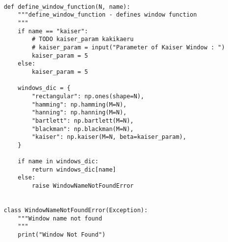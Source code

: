 \begin{lstlisting}[caption=plot\_tools.py,label=plot\_tools.py]
    
    def define_window_function(N, name):
        """define_window_function - defines window function
        """
        if name == "kaiser":
            # TODO kaiser_param kakikaeru
            # kaiser_param = input("Parameter of Kaiser Window : ")
            kaiser_param = 5
        else:
            kaiser_param = 5
    
        windows_dic = {
            "rectangular": np.ones(shape=N),
            "hamming": np.hamming(M=N),
            "hanning": np.hanning(M=N),
            "bartlett": np.bartlett(M=N),
            "blackman": np.blackman(M=N),
            "kaiser": np.kaiser(M=N, beta=kaiser_param),
        }
    
        if name in windows_dic:
            return windows_dic[name]
        else:
            raise WindowNameNotFoundError
    
    
    class WindowNameNotFoundError(Exception):
        """Window name not found
        """
        print("Window Not Found")
    
\end{lstlisting}

